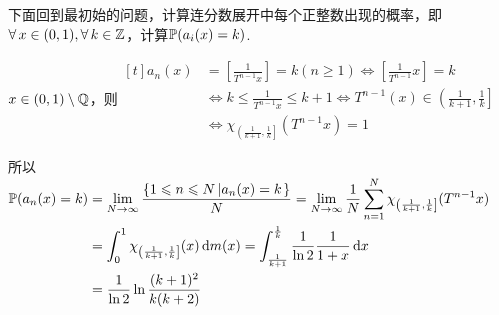 下面回到最初始的问题，计算连分数展开中每个正整数出现的概率，即$\forall\, x\in(0,1),\forall\, k\in\mathbb{Z}$，计算$\mathbb{P}(a_i(x)=k)$.\par
$x\in(0,1)\setminus\mathbb{Q}$，则$\begin{aligned}[t]
    a_n(x)&=\left[\frac{1}{T^{n-1}x}\right]=k(n\geq 1) \Leftrightarrow \left[\frac{1}{T^{n-1}}x\right]=k \\
    &\Leftrightarrow k\leq \frac{1}{T^{n-1}x}\leq k+1 \Leftrightarrow T^{n-1}(x)\in \left(\frac{1}{k+1},\frac{1}{k}\right] \\
    &\Leftrightarrow \chi_{\left(\frac{1}{k+1},\frac{1}{k}\right]}(T^{n-1}x)=1
\end{aligned}$\par
所以$\begin{aligned}[t]
    \mathbb{P}(a_n(x)=k) &= \lim_{N\to\infty}{\frac{\left\{1\leqslant n\leqslant N\left|a_n(x)=k\right.\right\}}{N}} = \lim_{N\to\infty}{\frac{1}{N}\sum_{n=1}^N{\chi_{\left(\frac{1}{k+1},\frac{1}{k}\right]}(T^{n-1}x)}} \\
    &=\int_{0}^1{\chi_{\left(\frac{1}{k+1},\frac{1}{k}\right]}(x)}\mathop{}\!\mathrm{d} m(x) =\int_{\frac{1}{k+1}}^{\frac{1}{k}}{\frac{1}{\ln{2}}\frac{1}{1+x}}\mathop{}\!\mathrm{d} x \\
    &=\frac{1}{\ln{2}}\ln{\frac{(k+1)^2}{k(k+2)}}
\end{aligned}$

